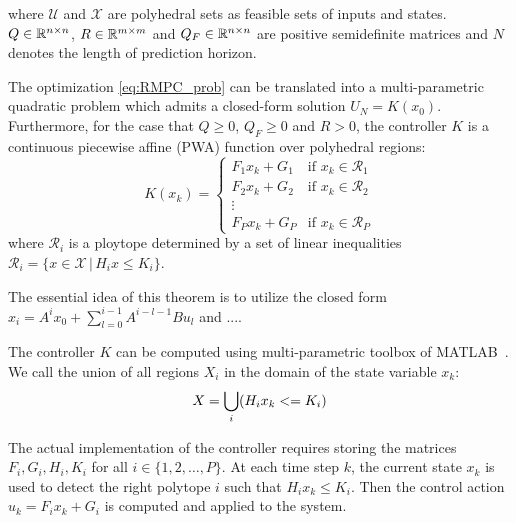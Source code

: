 where $\mathcal U$ and $\mathcal X$ are polyhedral sets as feasible sets of inputs and states. $Q\in\mathbb{R}^{n\times n}$, $R\in\mathbb{R}^{m\times m}$ and $Q_F\in\mathbb{R}^{n\times n}$ are positive semidefinite matrices and $N$ denotes the length of prediction horizon.
\begin{theorem}
The optimization  \eqref{eq:RMPC_prob} can be translated into a multi-parametric quadratic problem which admits a closed-form solution $U_N=K(x_0)$. Furthermore, for the case that $Q\geq0$, $Q_F\geq0$ and $R>0$, the controller $K$ is a continuous piecewise affine (PWA) function over polyhedral regions:
\begin{equation}
K(x_k)=
\begin{cases}
F_1x_k+G_1 & \text{if $x_k\in \mathcal{R}_1$}\\
F_2x_k+G_2 & \text{if $x_k\in \mathcal{R}_2$}\\
\vdots\\
F_Px_k+G_P & \text{if $x_k\in \mathcal{R}_P$}
\end{cases} 
\end{equation}
where $\mathcal{R}_i$ is a ploytope determined by a set of linear inequalities $\mathcal R_i = \{x\in\mathcal X\,|\,H_ix\leq K_i\}$. 
\end{theorem}
The essential idea of this theorem is to utilize the closed form $x_i=A^ix_0+\sum_{l=0}^{i-1}A^{i-l-1}Bu_l$ and .... 


The controller $K$ can be computed using multi-parametric toolbox of MATLAB~\cite{matlabMPT, matlabYALMIP}. We call \statespace\space the union of all regions $X_{i}$ in the domain of the state variable $x_{k}$:
\begin{equation}
X = \bigcup_{i}(H_{i}x_{k}<=K_{i})
\end{equation}

The actual implementation of the controller requires storing the matrices $F_i,G_i,H_i,K_i$ for all $i\in\{1,2,\ldots,P\}$. At each time step $k$, the current state $x_k$ is used to detect the right polytope $i$ such that $H_i x_k\le K_i$. Then the control action $u_k = F_i x_k + G_i$ is computed and applied to the system.

